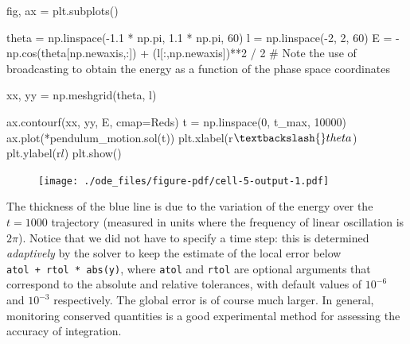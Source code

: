 \documentclass[
  letterpaper,
  DIV=11,
  numbers=noendperiod]{scrreprt}
\newenvironment{Shaded}{\begin{snugshade}}{\end{snugshade}}
\newcommand{\CommentTok}[1]{\textcolor[rgb]{0.37,0.37,0.37}{#1}}
\newcommand{\DecValTok}[1]{\textcolor[rgb]{0.68,0.00,0.00}{#1}}
\newcommand{\FloatTok}[1]{\textcolor[rgb]{0.68,0.00,0.00}{#1}}
\newcommand{\NormalTok}[1]{\textcolor[rgb]{0.00,0.23,0.31}{#1}}
\newcommand{\OperatorTok}[1]{\textcolor[rgb]{0.37,0.37,0.37}{#1}}
\newcommand{\StringTok}[1]{\textcolor[rgb]{0.13,0.47,0.30}{#1}}
\newcommand{\VerbatimStringTok}[1]{\textcolor[rgb]{0.13,0.47,0.30}{#1}}
\theoremstyle{definition}
\theoremstyle{remark}
\begin{document}
\begin{Shaded}
\begin{Highlighting}[]
\NormalTok{fig, ax }\OperatorTok{=}\NormalTok{ plt.subplots()}

\NormalTok{theta }\OperatorTok{=}\NormalTok{ np.linspace(}\OperatorTok{{-}}\FloatTok{1.1} \OperatorTok{*}\NormalTok{ np.pi, }\FloatTok{1.1} \OperatorTok{*}\NormalTok{ np.pi, }\DecValTok{60}\NormalTok{)}
\NormalTok{l }\OperatorTok{=}\NormalTok{ np.linspace(}\OperatorTok{{-}}\DecValTok{2}\NormalTok{, }\DecValTok{2}\NormalTok{, }\DecValTok{60}\NormalTok{)}
\NormalTok{E }\OperatorTok{=} \OperatorTok{{-}}\NormalTok{np.cos(theta[np.newaxis,:]) }\OperatorTok{+}\NormalTok{ (l[:,np.newaxis])}\OperatorTok{**}\DecValTok{2} \OperatorTok{/} \DecValTok{2}
\CommentTok{\# Note the use of broadcasting to obtain the energy as a function of the phase space coordinates}

\NormalTok{xx, yy }\OperatorTok{=}\NormalTok{ np.meshgrid(theta, l)}

\NormalTok{ax.contourf(xx, yy, E, cmap}\OperatorTok{=}\StringTok{\textquotesingle{}Reds\textquotesingle{}}\NormalTok{)}
\NormalTok{t }\OperatorTok{=}\NormalTok{ np.linspace(}\DecValTok{0}\NormalTok{, t\_max, }\DecValTok{10000}\NormalTok{)}
\NormalTok{ax.plot(}\OperatorTok{*}\NormalTok{pendulum\_motion.sol(t))}
\NormalTok{plt.xlabel(}\VerbatimStringTok{r\textquotesingle{}$\textbackslash{}theta$\textquotesingle{}}\NormalTok{)}
\NormalTok{plt.ylabel(}\VerbatimStringTok{r\textquotesingle{}$l$\textquotesingle{}}\NormalTok{)}
\NormalTok{plt.show()}
\end{Highlighting}
\end{Shaded}

\begin{figure}[H]

{\centering \texttt{[image: ./ode\_files/figure-pdf/cell-5-output-1.pdf]}

}

\end{figure}

The thickness of the blue line is due to the variation of the energy
over the \(t=1000\) trajectory (measured in units where the frequency of
linear oscillation is \(2\pi\)). Notice that we did not have to specify
a time step: this is determined \emph{adaptively} by the solver to keep
the estimate of the local error below \texttt{atol\ +\ rtol\ *\ abs(y)},
where \texttt{atol} and \texttt{rtol} are optional arguments that
correspond to the absolute and relative tolerances, with default values
of \(10^{-6}\) and \(10^{-3}\) respectively. The global error is of
course much larger. In general, monitoring conserved quantities is a
good experimental method for assessing the accuracy of integration.
\end{document}
